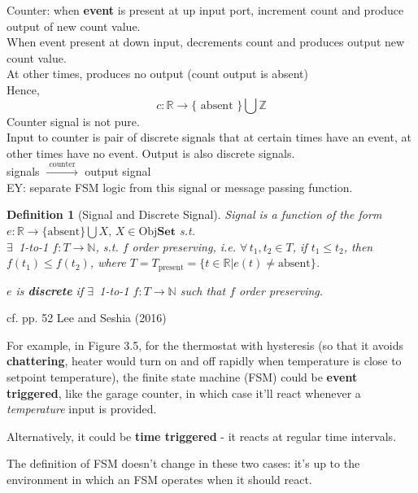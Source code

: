 \documentclass[10pt]{amsart}
\newtheorem{definition}{Definition}
\begin{document}
Counter: when \textbf{event} is present at up input port, increment count and produce output of new count value. \\
When event present at down input, decrements count and produces output new count value. \\
At other times, produces no output (count output is absent) \\

Hence, 
\[
c: \mathbb{R} \to \lbrace \text{ absent }\rbrace \bigcup \mathbb{Z}
	\]
	Counter signal is not pure. \\
	
	Input to counter is pair of discrete signals that at certain times have an event, at other times have no event. Output is also discrete signals. \\
	
	signals $\xrightarrow{ \text{ counter } }$ output signal \\
	
	EY: separate FSM logic from this signal or message passing function.


\begin{definition}[Signal and Discrete Signal]
	Signal is a function of the form $e : \mathbb{R} \to \lbrace \text{absent} \rbrace \bigcup X, \, X \in \text{Obj}{\mathbf{Set}}$ s.t. \\
	$\exists \,$ 1-to-1 $f: T \to \mathbb{N}$, s.t. $f$ order preserving, i.e. $\forall \, t_1, t_2 \in T$, if $t_1 \leq t_2$, then $f(t_1) \leq f(t_2)$, where $T = T_{\text{present}} = \lbrace t \in \mathbb{R} | e(t) \neq \text{absent} \rbrace$.

	$e$ is \textbf{discrete} if $\exists \,$ 1-to-1 $f:T\to \mathbb{N}$ such that $f$ order preserving.

\end{definition} 

cf. pp. 52 Lee and Seshia (2016) \cite{LeSe2016}

For example, in Figure 3.5, for the thermostat with hysteresis (so that it avoids \textbf{chattering}, heater would turn on and off rapidly when temperature is close to setpoint temperature), the finite state machine (FSM) could be \textbf{event triggered}, like the garage counter, in which case it'll react whenever a \emph{temperature} input is provided.

Alternatively, it could be \textbf{time triggered} - it reacts at regular time intervals.

The definition of FSM doesn't change in these two cases: it's up to the environment in which an FSM operates when it should react.
\end{document}
